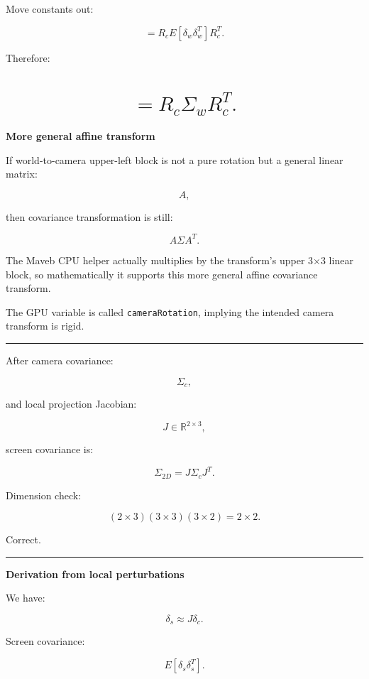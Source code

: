 Move constants out:

\[
=
R_c
E[
\delta_w\delta_w^T
]
R_c^T.
\]

Therefore:

\section{\texorpdfstring{\[
=
R_c\Sigma_wR_c^T.
\]}{
=
R\_c\textbackslash Sigma\_wR\_c\^{}T.
}}\label{04-visual-computing-ii-ch038-r_csigma_wr_ct.}

\textbf{More general affine transform}

If world-to-camera upper-left block is not a pure rotation but a general linear matrix:

\[
A,
\]

then covariance transformation is still:

\[
\boxed{
A\Sigma A^T.
}
\]

The Maveb CPU helper actually multiplies by the transform's upper 3×3 linear block, so mathematically it supports this more general affine covariance transform.

The GPU variable is called \texttt{cameraRotation}, implying the intended camera transform is rigid.

\begin{center}\rule{0.5\linewidth}{0.5pt}\end{center}

After camera covariance:

\[
\Sigma_c,
\]

and local projection Jacobian:

\[
J\in\mathbb R^{2\times3},
\]

screen covariance is:

\[
\boxed{
\Sigma_{2D}
=
J
\Sigma_c
J^T.
}
\]

Dimension check:

\[
(2\times3)
(3\times3)
(3\times2)
=
2\times2.
\]

Correct.

\begin{center}\rule{0.5\linewidth}{0.5pt}\end{center}

\textbf{Derivation from local perturbations}

We have:

\[
\delta_s
\approx
J\delta_c.
\]

Screen covariance:

\[
E[
\delta_s
\delta_s^T
].
\]

